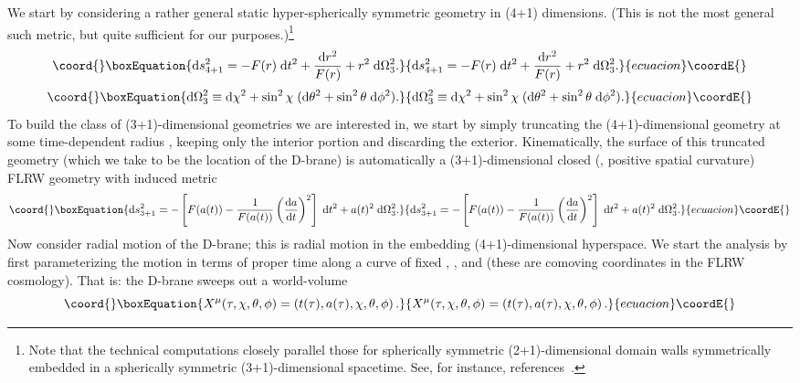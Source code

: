 \documentclass[a4paper,12pt]{article}
\begin{document}
We start by considering a rather general static hyper-spherically
symmetric geometry in (4+1) dimensions. (This is not the most general
such metric, but quite sufficient for our purposes.)\footnote{
Note that the technical computations closely parallel those for
spherically symmetric (2+1)-dimensional domain walls symmetrically
embedded in a spherically symmetric (3+1)-dimensional spacetime. See,
for instance, references~\cite{Book,Surgery,Brane-surgery}.}
%
\begin{equation}\coord{}\boxEquation{
\label{E:bulk}
\d s^2_{4+1} = - F(r) \; \d t^2 +{\d r^2\over F(r)} + r^2 \; \d\Omega_3^2.
}{
\d s^2_{4+1} = - F(r) \; \d t^2 +{\d r^2\over F(r)} + r^2 \; \d\Omega_3^2.
}{ecuacion}\coordE{}\end{equation}
%
\begin{equation}\coord{}\boxEquation{
\d\Omega_3^2 \equiv \d\chi^2 + 
\sin^2\chi \; (\d\theta^2 + \sin^2\theta \; \d\phi^2).
}{
\d\Omega_3^2 \equiv \d\chi^2 + 
\sin^2\chi \; (\d\theta^2 + \sin^2\theta \; \d\phi^2).
}{ecuacion}\coordE{}\end{equation}
%
To build the class of (3+1)-dimensional geometries we are interested
in, we start by simply truncating the (4+1)-dimensional geometry at
some time-dependent radius \coordHE{}, keeping only the interior portion
and discarding the exterior.  Kinematically, the surface of this
truncated geometry (which we take to be the location of the D-brane)
is automatically a (3+1)-dimensional closed (\coordHE{}, positive spatial
curvature) FLRW geometry with induced metric
%
\begin{equation}\coord{}\boxEquation{
\d s^2_{3+1} = 
-
\left[ F(a(t)) - {1\over F(a(t))} \left({\d a\over\d t}\right)^2 \right]\; \d t^2 
+ a(t)^2  \; \d\Omega_3^2.
}{
\d s^2_{3+1} = 
-
\left[ F(a(t)) - {1\over F(a(t))} \left({\d a\over\d t}\right)^2 \right]\; \d t^2 
+ a(t)^2  \; \d\Omega_3^2.
}{ecuacion}\coordE{}\end{equation}
%
Now consider radial motion of the D-brane; this is radial motion in
the embedding (4+1)-dimensional hyperspace. We start the analysis by
first parameterizing the motion in terms of proper time along a curve
of fixed \myHighlight{$\chi$}\coordHE{}, \myHighlight{$\theta$}\coordHE{}, and \myHighlight{$\phi$}\coordHE{} (these are comoving coordinates
in the FLRW cosmology). That is: the D-brane sweeps out a world-volume
%
\begin{equation}\coord{}\boxEquation{
X^\mu(\tau,\chi,\theta,\phi) = \left(t(\tau),a(\tau),\chi,\theta,\phi\right).
}{
X^\mu(\tau,\chi,\theta,\phi) = \left(t(\tau),a(\tau),\chi,\theta,\phi\right).
}{ecuacion}\coordE{}\end{equation}
\end{document}
